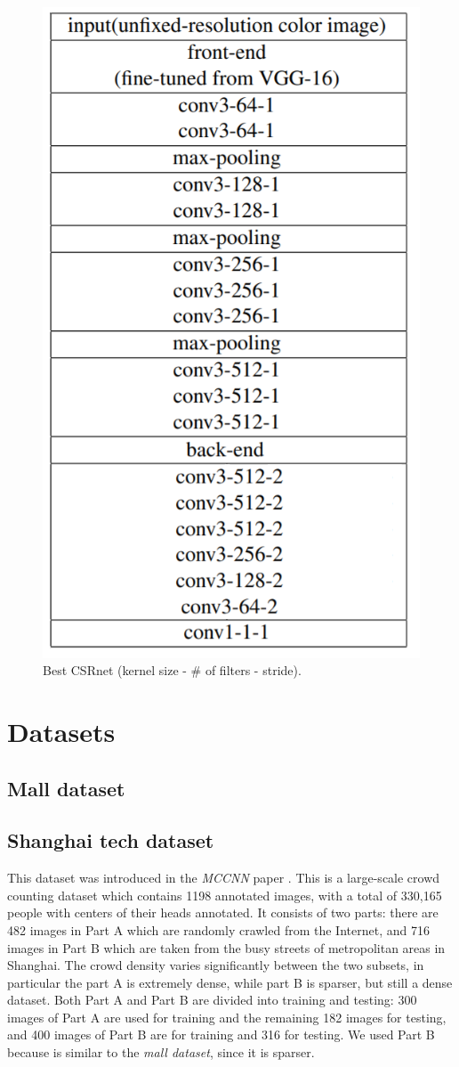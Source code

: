 \documentclass[10pt,twocolumn,letterpaper]{article}
\begin{document}
\begin{figure}[h!]
	\includegraphics[width=0.5\columnwidth]{pics/CSRnet.png}
	\centering
	\caption{Best CSRnet  (kernel size - \# of filters - stride).}
	\centering
	\label{fig:CSRnet}
\end{figure}



\section{Datasets}
\subsection{Mall dataset}
\subsection{Shanghai tech dataset}
This dataset was introduced in the \textit{MCCNN} paper \cite{zhang2016single}. This is a large-scale crowd counting dataset  which contains 1198 annotated images, with
a total of 330,165 people with centers of their heads annotated. It consists of two parts: there are 482 images in Part A which are randomly crawled from the Internet, and 716 images in Part B which are taken from the busy streets of metropolitan areas in Shanghai. The crowd density varies significantly between the two subsets, in particular the part A is extremely dense, while part B is sparser, but still a dense dataset. Both Part A and Part B are divided into training and testing: 300
images of Part A are used for training and the remaining 182 images for testing, and 400 images of Part B are for training and 316 for testing. We used Part B because is similar to the \textit{mall dataset}, since it is sparser.
\end{document}
